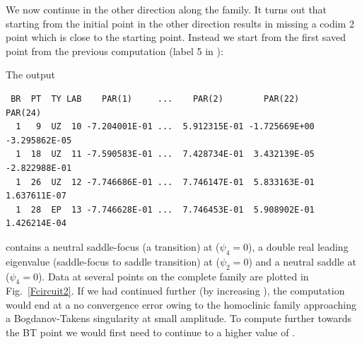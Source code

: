 \documentclass[12pt]{report}
\begin{document}
We now continue in the other direction along the family. It turns out
that starting from the initial point in the other direction results in
missing a codim 2 point which is close to the starting point. Instead we
start from the first saved point from the previous computation
(label 5 in ):
\begin{center}
\end{center}
The output
\begin{verbatim}
 BR  PT  TY LAB    PAR(1)     ...    PAR(2)        PAR(22)       PAR(24)    
  1   9  UZ  10 -7.204001E-01 ...  5.912315E-01 -1.725669E+00 -3.295862E-05
  1  18  UZ  11 -7.590583E-01 ...  7.428734E-01  3.432139E-05 -2.822988E-01
  1  26  UZ  12 -7.746686E-01 ...  7.746147E-01  5.833163E-01  1.637611E-07
  1  28  EP  13 -7.746628E-01 ...  7.746453E-01  5.908902E-01  1.426214E-04
\end{verbatim}
contains a neutral saddle-focus (a  transition) 
at  ($\psi_4=0$), a double real leading eigenvalue 
(saddle-focus to saddle transition) at  ($\psi_2=0$) 
and a neutral saddle at  ($\psi_4=0$). Data at several
points on the complete family are plotted in Fig.\ \ref{Fcircuit2}.
If we had continued further (by increasing ), 
the computation would end at a no convergence error  owing 
to the homoclinic family approaching a Bogdanov-Takens singularity 
at small amplitude. To compute further towards the BT point 
we would first need to continue to a higher value of .
\end{document}

